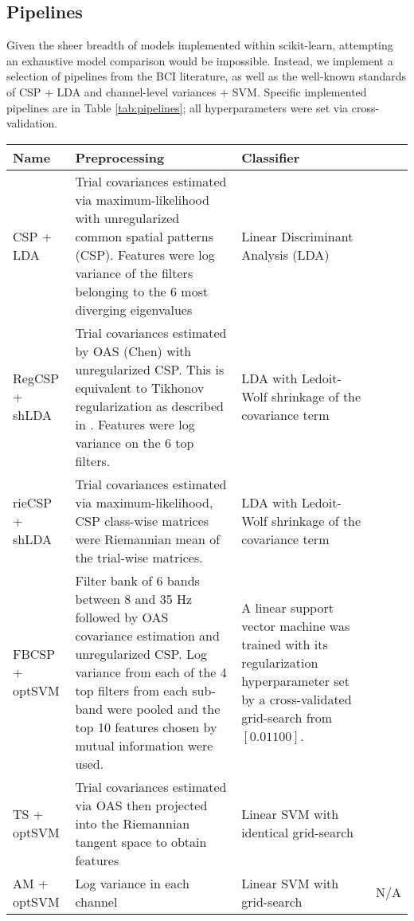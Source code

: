 \subsection{Pipelines}

Given the sheer breadth of models implemented within scikit-learn,
attempting an exhaustive model comparison would be impossible. Instead, we
implement a selection of pipelines from the BCI literature, as well as the
well-known standards of CSP + LDA and channel-level variances + SVM. Specific
implemented pipelines are in Table \ref{tab:pipelines}; all hyperparameters were set via cross-validation.
\begin{table*}
  \centering
  \begin{tabular}{ l || p{6cm} | p{6cm} | c | }
    
    Name & Preprocessing & Classifier \\ \hline
    CSP + LDA & Trial covariances estimated via maximum-likelihood with unregularized common spatial patterns (CSP). Features were log variance of the filters belonging to the 6 most diverging eigenvalues & Linear Discriminant Analysis (LDA) & \cite{Koles1990} \\ \hline
    RegCSP + shLDA & Trial covariances estimated by OAS (Chen) with
                     unregularized CSP. This is equivalent to Tikhonov
                     regularization as described in \cite{Lotte2011}. Features were log variance on the 6 top filters. & LDA with Ledoit-Wolf shrinkage of the covariance term  & \cite{Lotte2011} \\ \hline
    rieCSP + shLDA & Trial covariances estimated via maximum-likelihood, CSP class-wise matrices were Riemannian mean of the trial-wise matrices. & LDA with Ledoit-Wolf shrinkage of the covariance term  & \cite{Barachant2010a} \\ \hline
    FBCSP + optSVM & Filter bank of 6 bands between 8 and 35 Hz followed by OAS covariance estimation and unregularized CSP. Log variance from each of the 4 top filters from each sub-band were pooled and the top 10 features chosen by mutual information were used. & A linear support vector machine was trained with its regularization hyperparameter set by a cross-validated grid-search from $[0.01 100]$. & \cite{KaiKengAng2008} \\ \hline
    TS + optSVM & Trial covariances estimated via OAS then projected into the Riemannian tangent space to obtain features & Linear SVM with identical grid-search & \cite{Barachant2013} \\ \hline
    AM + optSVM & Log variance in each channel & Linear SVM with grid-search & N/A \\ \hline
    
  \end{tabular}
  \caption{Processing pipelines}
  \label{tab:pipelines}
\end{table*}
  


